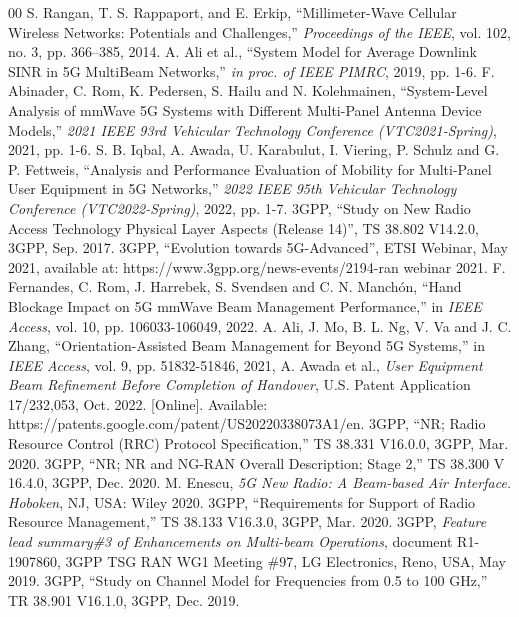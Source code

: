 \documentclass[10pt, conference]{IEEEtran}
\begin{document}
%
\begin{thebibliography}{00}
\vspace{-2mm}
 S. Rangan, T. S. Rappaport, and E. Erkip, “Millimeter-Wave Cellular Wireless Networks: Potentials and Challenges,” \textit{Proceedings of the IEEE}, vol. 102, no. 3, pp. 366–385, 2014.
  A. Ali et al., “System Model for Average Downlink SINR in 5G MultiBeam Networks,” \textit{in proc. of IEEE PIMRC}, 2019, pp. 1-6.
 F. Abinader, C. Rom, K. Pedersen, S. Hailu and N. Kolehmainen, “System-Level Analysis of mmWave 5G Systems with Different Multi-Panel Antenna Device Models,” \textit{2021 IEEE 93rd Vehicular Technology Conference (VTC2021-Spring)}, 2021, pp. 1-6.
 S. B. Iqbal, A. Awada, U. Karabulut, I. Viering, P. Schulz and G. P. Fettweis, “Analysis and Performance Evaluation of Mobility for Multi-Panel User Equipment in 5G Networks,” \textit{2022 IEEE 95th Vehicular Technology Conference (VTC2022-Spring)}, 2022, pp. 1-7.
 3GPP, “Study on New Radio Access Technology Physical Layer Aspects (Release 14)”, TS 38.802 V14.2.0, 3GPP, Sep. 2017.
 3GPP, “Evolution towards 5G-Advanced”, ETSI Webinar, May 2021, available at: https://www.3gpp.org/news-events/2194-ran webinar 2021.
 F. Fernandes, C. Rom, J. Harrebek, S. Svendsen and C. N. Manchón, “Hand Blockage Impact on 5G mmWave Beam Management Performance,” in \textit{IEEE Access}, vol. 10, pp. 106033-106049, 2022.
 A. Ali, J. Mo, B. L. Ng, V. Va and J. C. Zhang, “Orientation-Assisted Beam Management for Beyond 5G Systems,” in \textit{IEEE Access}, vol. 9, pp. 51832-51846, 2021, 
 A. Awada et al., \textit{User Equipment Beam Refinement Before Completion of Handover}, U.S. Patent Application 17/232,053, Oct. 2022. [Online]. Available: https://patents.google.com/patent/US20220338073A1/en.
 3GPP, “NR; Radio Resource Control (RRC) Protocol Specification,” TS 38.331 V16.0.0, 3GPP, Mar. 2020.
 3GPP, “NR; NR and NG-RAN Overall Description; Stage 2,” TS 38.300 V 16.4.0, 3GPP, Dec. 2020.
 M. Enescu, \textit{5G New Radio: A Beam-based Air Interface. Hoboken}, NJ, USA: Wiley 2020.
 3GPP, “Requirements for Support of Radio Resource Management,” TS 38.133 V16.3.0, 3GPP, Mar. 2020. 
 3GPP, \textit{Feature lead summary\#3 of Enhancements on Multi-beam Operations}, document R1-1907860, 3GPP TSG RAN WG1 Meeting \#97, LG Electronics, Reno, USA, May 2019.
 3GPP, “Study on Channel Model for Frequencies from 0.5 to 100 GHz,” TR 38.901 V16.1.0, 3GPP, Dec. 2019.

\end{thebibliography}
\end{document}
